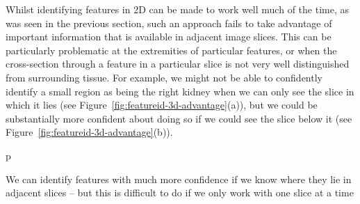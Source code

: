 \vspace{-.3\baselineskip}

Whilst identifying features in 2D can be made to work well much of the time, as was seen in the previous section, such an approach fails to take advantage of important information that is available in adjacent image slices. This can be particularly problematic at the extremities of particular features, or when the cross-section through a feature in a particular slice is not very well distinguished from surrounding tissue. For example, we might not be able to confidently identify a small region as being the right kidney when we can only see the slice in which it lies (see Figure~\ref{fig:featureid-3d-advantage}(a)), but we could be substantially more confident about doing so if we could see the slice below it (see Figure~\ref{fig:featureid-3d-advantage}(b)).

\begin{stusubfig}{p}
	\hspace{4mm}%
\caption{We can identify features with much more confidence if we know where they lie in adjacent slices -- but this is difficult to do if we only work with one slice at a time}
\label{fig:featureid-3d-advantage}
\end{stusubfig}

